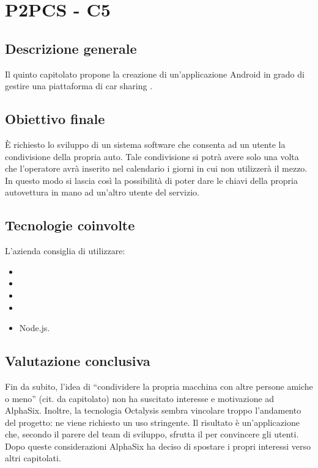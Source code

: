 \section{P2PCS - C5} \label{c5}
    \subsection{Descrizione generale}
    Il quinto capitolato propone la creazione di un'applicazione Android in grado di gestire una piattaforma di car sharing .

    \subsection{Obiettivo finale}
    \`E richiesto lo sviluppo di un sistema software che consenta ad un utente la condivisione della propria auto. Tale condivisione si potrà
    avere solo una volta che l'operatore avrà inserito nel calendario i giorni in cui non utilizzerà il mezzo.
    In questo modo si lascia così la possibilità di poter dare le chiavi della propria autovettura in mano ad un'altro utente del servizio.

    \subsection{Tecnologie coinvolte}
    L'azienda consiglia di utilizzare:
        \begin{itemize}
        \item {}
        \item {}
        \item {}
        \item {}
        \item Node.js.
    \end{itemize}

    \subsection{Valutazione conclusiva}
    Fin da subito, l'idea di ``condividere la propria macchina con altre persone amiche o meno'' (cit. da capitolato) non ha suscitato interesse
    e motivazione ad AlphaSix. Inoltre, la tecnologia Octalysis sembra vincolare troppo l'andamento del progetto: ne viene richiesto un
    uso stringente. Il risultato è un'applicazione che, secondo il parere del team di sviluppo, sfrutta il  per convincere gli utenti.
    Dopo queste considerazioni AlphaSix ha deciso di spostare i propri interessi verso altri capitolati.
